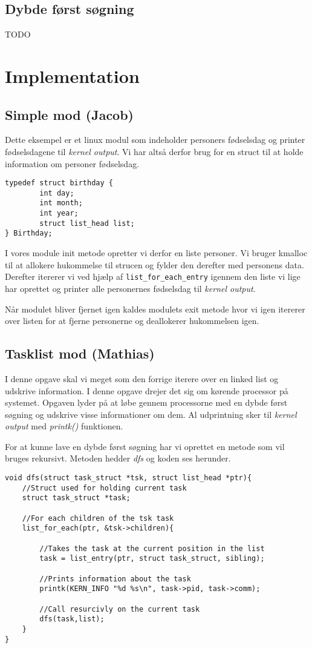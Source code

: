 \documentclass[danish]{report}
\begin{document}
\section{Dybde først søgning}
TODO


\chapter{Implementation}
\section{Simple mod (Jacob)}

Dette eksempel er et linux modul som indeholder personers fødselsdag og printer fødselsdagene til \textit{kernel output}. Vi har altså derfor brug for en struct til at holde information om personer fødselsdag.

\begin{lstlisting}
typedef struct birthday {
        int day;
        int month;
        int year;
        struct list_head list;
} Birthday;
\end{lstlisting}

I vores module init metode opretter vi derfor en liste personer. Vi bruger kmalloc til at allokere hukommelse til strucen og fylder den derefter med personens data. Derefter itererer vi ved hjælp af \texttt{list\_for\_each\_entry} igennem den liste vi lige har oprettet og printer alle personernes fødselsdag til \textit{kernel output}.

Når modulet bliver fjernet igen kaldes modulets exit metode hvor vi igen itererer over listen for at fjerne personerne og deallokerer hukommelsen igen. 


\section{Tasklist mod (Mathias)}
I denne opgave skal vi meget som den forrige iterere over en linked list og udskrive information. I denne opgave drejer det sig om kørende processor på systemet. Opgaven lyder på at løbe gennem processorne med en dybde først søgning og udskrive visse informationer om dem. Al udprintning sker til \textit{kernel output} med \textit{printk()} funktionen.

For at kunne lave en dybde først søgning har vi oprettet en metode som vil bruges rekursivt. Metoden hedder \textit{dfs} og koden ses herunder.

\begin{lstlisting}
void dfs(struct task_struct *tsk, struct list_head *ptr){
	//Struct used for holding current task
	struct task_struct *task;
	
	//For each children of the tsk task
	list_for_each(ptr, &tsk->children){
		
		//Takes the task at the current position in the list
		task = list_entry(ptr, struct task_struct, sibling);
		
		//Prints information about the task
		printk(KERN_INFO "%d %s\n", task->pid, task->comm);
		
		//Call resurcivly on the current task
		dfs(task,list);
	}
}
\end{lstlisting}
\end{document}
